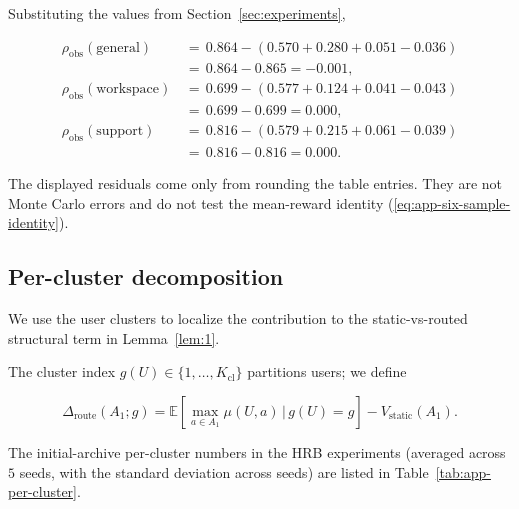 \documentclass{article} %
\renewcommand{\eqref}[1]{\textup{(\ref{#1})}}
\begin{document}
Substituting the values from Section~\ref{sec:experiments},

\begin{equation}
\label{eq:app-residual-num}
\begin{aligned}
\rho_{\mathrm{obs}}(\mathrm{general})  &\,=\, 0.864 - (0.570 + 0.280 + 0.051 - 0.036)\\
                        &\,=\, 0.864 - 0.865 = -0.001,\\
\rho_{\mathrm{obs}}(\mathrm{workspace})&\,=\, 0.699 - (0.577 + 0.124 + 0.041 - 0.043)\\
                        &\,=\, 0.699 - 0.699 = 0.000,\\
\rho_{\mathrm{obs}}(\mathrm{support})  &\,=\, 0.816 - (0.579 + 0.215 + 0.061 - 0.039)\\
                        &\,=\, 0.816 - 0.816 = 0.000.
\end{aligned}
\end{equation}

The displayed residuals come only from rounding the table entries. They are
not Monte Carlo errors and do not test the mean-reward identity
\eqref{eq:app-six-sample-identity}.

\subsection{Per-cluster decomposition}

\label{app:per-cluster}

We use the user clusters to localize the contribution to the static-vs-routed
structural term in Lemma~\ref{lem:1}.

The cluster index
\(g(U)\in\{1,\dots,K_{\mathrm{cl}}\}\) partitions users; we define

\begin{equation}
\label{eq:app-per-cluster-het}
\Delta_{\mathrm{route}}(A_1;g) = \mathbb{E}\!\left[\max_{a\in A_1}\mu(U,a)\,\bigg|\,g(U)=g\right] - V_{\mathrm{static}}(A_1).
\end{equation}

The initial-archive per-cluster numbers in the HRB experiments (averaged across $5$ seeds, with the standard deviation across seeds) are listed in Table~\ref{tab:app-per-cluster}.
\end{document}
